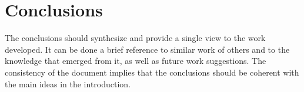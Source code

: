 \chapter{Conclusions}\label{cap:conclusions}

The conclusions should synthesize and provide a single view to the work developed. It can be done a brief reference to similar work of others and to the knowledge that emerged from it, as well as future work suggestions. The consistency of the document implies that the conclusions should be coherent with the main ideas in the introduction.
